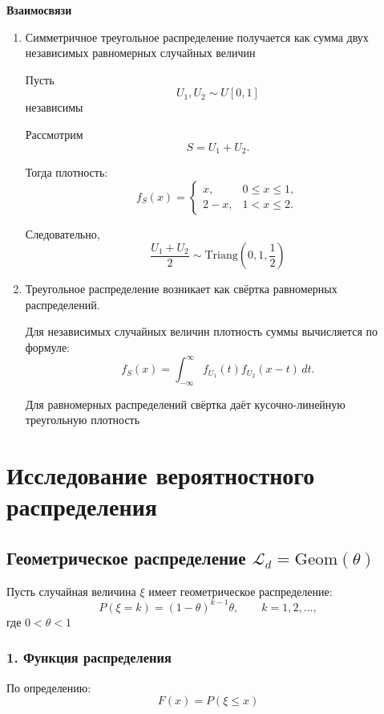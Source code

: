 \documentclass[12pt,a4paper]{article}
\theoremstyle{definition}
\begin{document}
\textbf{Взаимосвязи}
\begin{enumerate}
    \item Симметричное треугольное распределение получается как сумма двух независимых равномерных случайных величин

    Пусть
    \[
    U_1,U_2 \sim U[0,1]
    \]
    независимы

    Рассмотрим
    \[
    S=U_1+U_2.
    \]

    Тогда плотность:
    \[
    f_S(x)=
    \begin{cases}
    x, & 0\le x\le1,\\
    2-x, & 1<x\le2.
    \end{cases}
    \]

    Следовательно,
    \[
    \frac{U_1+U_2}{2}
    \sim
    \mathrm{Triang}\left(0,1,\frac12\right)
    \]

    \item Треугольное распределение возникает как свёртка равномерных распределений.

    Для независимых случайных величин плотность суммы вычисляется по формуле:
    \[
    f_S(x)=
    \int_{-\infty}^{\infty}
    f_{U_1}(t)f_{U_2}(x-t)\,dt.
    \]

    Для равномерных распределений свёртка даёт кусочно-линейную треугольную плотность

\end{enumerate}

\section{Исследование вероятностного распределения}

\subsection{\texorpdfstring
{Геометрическое распределение $\mathscr{L}_d=\mathrm{Geom}(\theta)$}
{Геометрическое распределение d = Geom(theta)}}

Пусть случайная величина $\xi$ имеет геометрическое распределение:
\[ P(\xi=k)=(1-\theta)^{k-1}\theta, \qquad k=1,2,\dots, \] где $0<\theta<1$

\subsubsection*{1. Функция распределения}

По определению:
\[F(x)=P(\xi\le x)\]
\end{document}
